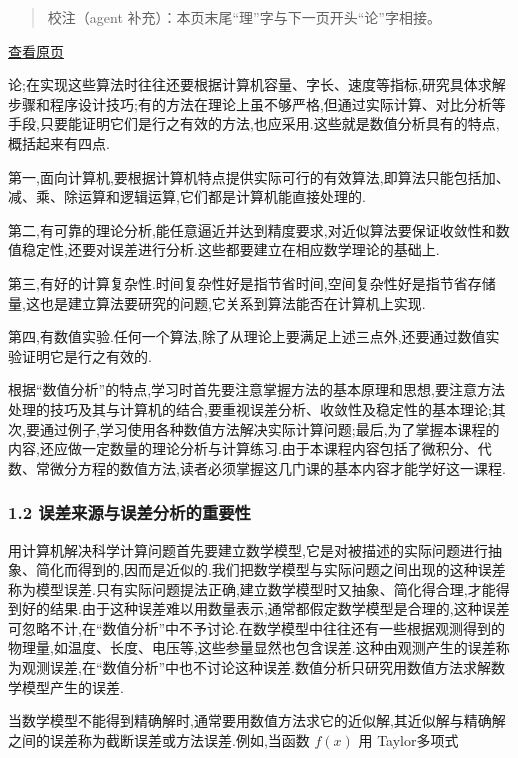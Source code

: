 \documentclass[
  10pt,
  fontset=fandol]{ctexart}
\begin{document}
\begin{quote}
校注（agent 补充）：本页末尾``理''字与下一页开头``论''字相接。
\end{quote}

\href{../../source-images/pdf-015.jpeg}{查看原页}

论;在实现这些算法时往往还要根据计算机容量、字长、速度等指标,研究具体求解步骤和程序设计技巧;有的方法在理论上虽不够严格,但通过实际计算、对比分析等手段,只要能证明它们是行之有效的方法,也应采用.这些就是数值分析具有的特点,概括起来有四点.

第一,面向计算机,要根据计算机特点提供实际可行的有效算法,即算法只能包括加、减、乘、除运算和逻辑运算,它们都是计算机能直接处理的.

第二,有可靠的理论分析,能任意逼近并达到精度要求,对近似算法要保证收敛性和数值稳定性,还要对误差进行分析.这些都要建立在相应数学理论的基础上.

第三,有好的计算复杂性.时间复杂性好是指节省时间,空间复杂性好是指节省存储量,这也是建立算法要研究的问题,它关系到算法能否在计算机上实现.

第四,有数值实验.任何一个算法,除了从理论上要满足上述三点外,还要通过数值实验证明它是行之有效的.

根据``数值分析''的特点,学习时首先要注意掌握方法的基本原理和思想,要注意方法处理的技巧及其与计算机的结合,要重视误差分析、收敛性及稳定性的基本理论;其次,要通过例子,学习使用各种数值方法解决实际计算问题;最后,为了掌握本课程的内容,还应做一定数量的理论分析与计算练习.由于本课程内容包括了微积分、代数、常微分方程的数值方法,读者必须掌握这几门课的基本内容才能学好这一课程.

\subsubsection{1.2 误差来源与误差分析的重要性}\label{ux8befux5deeux6765ux6e90ux4e0eux8befux5deeux5206ux6790ux7684ux91cdux8981ux6027}

用计算机解决科学计算问题首先要建立数学模型,它是对被描述的实际问题进行抽象、简化而得到的,因而是近似的.我们把数学模型与实际问题之间出现的这种误差称为模型误差.只有实际问题提法正确,建立数学模型时又抽象、简化得合理,才能得到好的结果.由于这种误差难以用数量表示,通常都假定数学模型是合理的,这种误差可忽略不计,在``数值分析''中不予讨论.在数学模型中往往还有一些根据观测得到的物理量,如温度、长度、电压等,这些参量显然也包含误差.这种由观测产生的误差称为观测误差,在``数值分析''中也不讨论这种误差.数值分析只研究用数值方法求解数学模型产生的误差.

当数学模型不能得到精确解时,通常要用数值方法求它的近似解,其近似解与精确解之间的误差称为截断误差或方法误差.例如,当函数 \(f(x)\) 用 Taylor多项式
\end{document}
